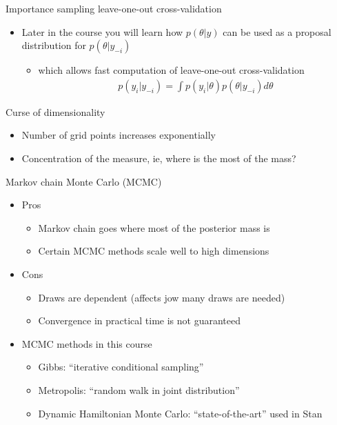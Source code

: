 \documentclass[finnish,english,t]{beamer}
\begin{document}
\begin{frame}
  
  {\Large\color{navyblue} Importance sampling leave-one-out cross-validation}

  \begin{itemize}
  \item Later in the course you will learn how $p(\theta|y)$ can be
    used as a proposal distribution for $p(\theta|y_{-i})$
    \begin{itemize}
    \item which allows fast computation of leave-one-out cross-validation
      \begin{align*}
        p(y_i|y_{-i})=\int p(y_i|\theta) p(\theta|y_{-i}) d\theta
      \end{align*}
    \end{itemize}
  \end{itemize}

\end{frame}

\begin{frame}
  
  {\Large\color{navyblue} Curse of dimensionality}

  \begin{itemize}
  \item Number of grid points increases exponentially
  \item Concentration of the measure, ie, where is the most of the
    mass?
  \end{itemize}

\end{frame}

\begin{frame}
  
  {\Large\color{navyblue} Markov chain Monte Carlo (MCMC)}

  \begin{itemize}
  \item Pros
    \begin{itemize}
    \item Markov chain goes where most of the posterior mass is
    \item Certain MCMC methods scale well to high dimensions
    \end{itemize}
  \item Cons
    \begin{itemize}
    \item Draws are dependent (affects jow many draws are needed)
    \item Convergence in practical time is not guaranteed
    \end{itemize}
  \item MCMC methods in this course
    \begin{itemize}
    \item Gibbs: ``iterative conditional sampling''
    \item Metropolis: ``random walk in joint distribution''
    \item Dynamic Hamiltonian Monte Carlo: ``state-of-the-art'' used in Stan
    \end{itemize}
  \end{itemize}

\end{frame}
\end{document}
